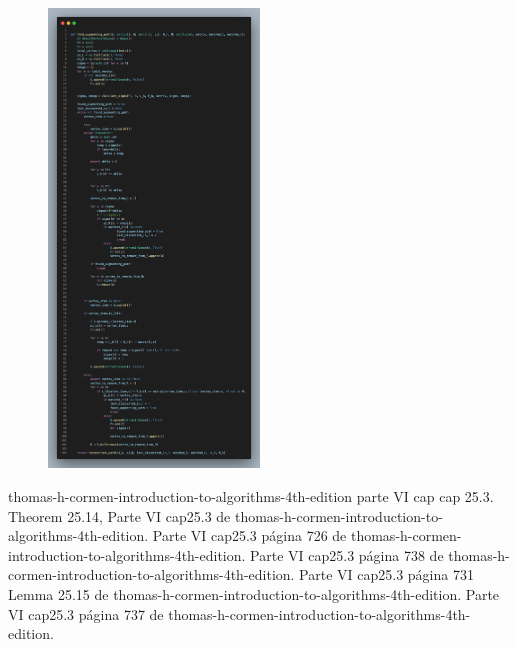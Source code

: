 \documentclass[sn-mathphys,Numbered]{sn-jnl}%
\theoremstyle{thmstyleone}%
\theoremstyle{thmstyletwo}%
\theoremstyle{thmstylethree}%
\begin{document}
\begin{figure}[htb]
        \centering
        \includegraphics[width=0.5\textwidth]{codel.png}
        \centering
    \end{figure}
 
 
\begin{thebibliography}{99}
 thomas-h-cormen-introduction-to-algorithms-4th-edition parte VI cap
 cap 25.3.
  Theorem 25.14, Parte VI cap25.3 de thomas-h-cormen-introduction-to-algorithms-4th-edition.
  Parte VI cap25.3 p\'agina 726 de thomas-h-cormen-introduction-to-algorithms-4th-edition.
 Parte VI cap25.3 p\'agina 738 de thomas-h-cormen-introduction-to-algorithms-4th-edition.
 Parte VI cap25.3 p\'agina 731 Lemma 25.15 de thomas-h-cormen-introduction-to-algorithms-4th-edition.
 Parte VI cap25.3 p\'agina 737 de thomas-h-cormen-introduction-to-algorithms-4th-edition.
\end{thebibliography}
\end{document}
